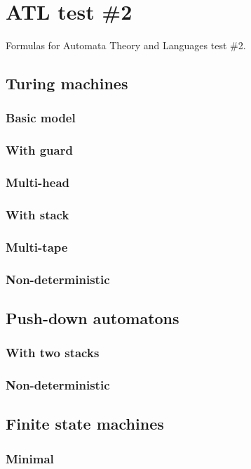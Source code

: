 \documentclass{article}
\begin{document}
\pagebreak[4]

\section{ATL test \#2}
Formulas for Automata Theory and Languages test \#2.

\subsection{Turing machines}

\subsubsection{Basic model}

\subsubsection{With guard}

\subsubsection{Multi-head}

\subsubsection{With stack}

\subsubsection{Multi-tape}

\subsubsection{Non-deterministic}

\subsection{Push-down automatons}

\subsubsection{With two stacks}

\subsubsection{Non-deterministic}

\subsection{Finite state machines}

\subsubsection{Minimal}
\end{document}
